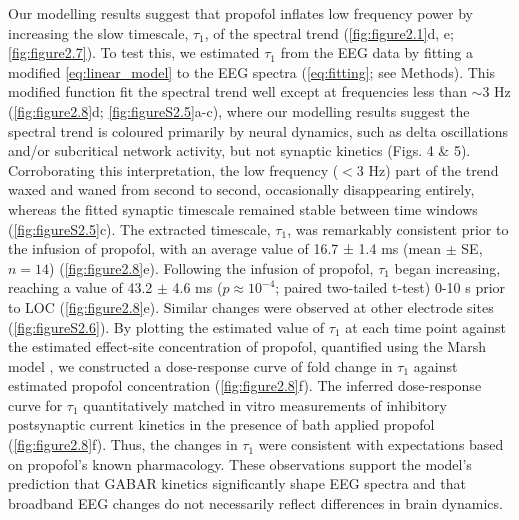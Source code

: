 Our modelling results suggest that propofol inflates low frequency power by increasing the slow timescale, $\tau_1$, of the spectral trend (\autoref{fig:figure2.1}d, e; \autoref{fig:figure2.7}). To test this, we estimated $\tau_1$ from the EEG data by fitting a modified \ref{eq:linear_model} to the EEG spectra (\ref{eq:fitting}; see Methods). This modified function fit the spectral trend well except at frequencies less than ${\sim}3$ \unit{\hertz} (\autoref{fig:figure2.8}d; \autoref{fig:figureS2.5}a-c), where our modelling results suggest the spectral trend is coloured primarily by neural dynamics, such as delta oscillations and/or subcritical network activity, but not synaptic kinetics (Figs. 4 \& 5). Corroborating this interpretation, the low frequency ($<3$ \unit{\hertz}) part of the trend waxed and waned from second to second, occasionally disappearing entirely, whereas the fitted synaptic timescale remained stable between time windows (\autoref{fig:figureS2.5}c). The extracted timescale, $\tau_1$, was remarkably consistent prior to the infusion of propofol, with an average value of 16.7 ± 1.4 ms (mean $\pm$ SE, $n=14$) (\autoref{fig:figure2.8}e). Following the infusion of propofol, $\tau_1$ began increasing, reaching a value of 43.2 $\pm$ 4.6 \unit{\milli\second} ($p \approx 10^{-4}$; paired two-tailed t-test) 0-10 \unit{\second} prior to LOC (\autoref{fig:figure2.8}e). Similar changes were observed at other electrode sites (\autoref{fig:figureS2.6}). By plotting the estimated value of $\tau_1$ at each time point against the estimated effect-site concentration of propofol, quantified using the Marsh model \cite{Marsh1991}, we constructed a dose-response curve of fold change in $\tau_1$ against estimated propofol concentration (\autoref{fig:figure2.8}f). The inferred dose-response curve for $\tau_1$ quantitatively matched in vitro measurements of inhibitory postsynaptic current kinetics in the presence of bath applied propofol \cite{Kitamura2003, Orser1994, Whittington1996} (\autoref{fig:figure2.8}f). Thus, the changes in $\tau_1$ were consistent with expectations based on propofol’s known pharmacology. These observations support the model’s prediction that GABAR kinetics significantly shape EEG spectra and that broadband EEG changes do not necessarily reflect differences in brain dynamics. 


